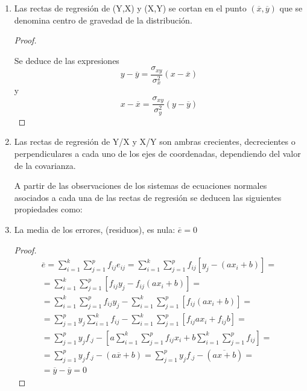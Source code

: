 \documentclass{article}
\theoremstyle{definition}
\begin{document}
\begin{enumerate}

\item Las rectas de regresión de (Y,X) y (X,Y)  se cortan en el punto
$(\overline{x},\overline{y} ) $ que se denomina centro de gravedad de la
distribución.

\begin{proof} $ $\newline

Se deduce de las expresiones $$ y - \overline{y} =
\frac{\sigma_{xy}}{\sigma_x^2} (x - \overline{x}) $$ y  $$ x - \overline{x} =
\frac{\sigma_{xy}}{\sigma_y^2} (y - \overline{y} ) $$

\end{proof}

\item Las rectas de regresión de Y/X y X/Y son ambras crecientes, decrecientes o
perpendiculares a cada uno de los ejes de coordenadas, dependiendo del valor de
la covarianza.

A partir de las observaciones de los sistemas de ecuaciones normales asociados a
cada una de las rectas de regresión se deducen las siguientes propiedades
como:

\item La media de los errores, (residuos), es nula: $\overline{e} = 0$

\begin{proof} $ $\newline
\begin{align*}
\overline{e} = \sum_{i=1}^k\sum_{j=1}^p f_{ij}e_{ij}
						 = \sum_{i=1}^k\sum_{j=1}^p f_{ij}[y_j - (ax_i +b)]  = \\
						 = \sum_{i=1}^k\sum_{j=1}^p [f_{ij}y_j - f_ {ij}(ax_i +b)] = \\
						 = \sum_{i=1}^k\sum_{j=1}^p f_{ij}y_j -
						 	 \sum_{i=1}^k\sum_{j=1}^p [f_ {ij}(ax_i +b)] = \\
						 = \sum_{j=1}^p y_j \sum_{i=1}^k f_{ij} -
						 		\sum_{i=1}^k\sum_{j=1}^p [f_{ij}ax_i + f_{ij}b] = \\
						 = \sum_{j=1}^p y_j f_{.j}
						 				- \left[a\sum_{i=1}^k\sum_{j=1}^p f_{ij} x_i
						 				+ b\sum_{i=1}^k\sum_{j=1}^p f_{ij}\right] = \\
							= \sum_{j=1}^p y_j f_{.j} - (a\overline{x}+b)
							= \sum_{j=1}^p y_j f_{.j} - (\overline{ax+b}) = \\
							= \overline{y} - \overline{y} = 0
\end{align*}
\end{proof}


\end{enumerate}
\end{document}
